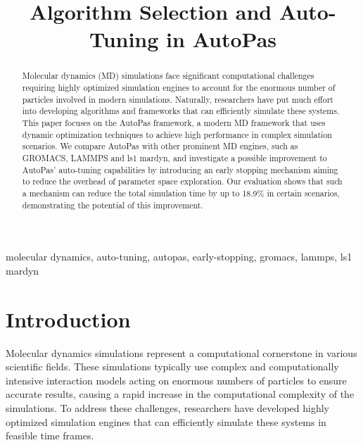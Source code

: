 \documentclass[conference]{IEEEtran}
\begin{document}
\title{Algorithm Selection and Auto-Tuning in AutoPas}

\author{
}

\maketitle

\begin{abstract}
    Molecular dynamics (MD) simulations face significant computational challenges requiring highly optimized simulation engines to account for the enormous number of particles involved in modern simulations. Naturally, researchers have put much effort into developing algorithms and frameworks that can efficiently simulate these systems. This paper focuses on the AutoPas framework, a modern MD framework that uses dynamic optimization techniques to achieve high performance in complex simulation scenarios. We compare AutoPas with other prominent MD engines, such as GROMACS, LAMMPS and ls1 mardyn, and investigate a possible improvement to AutoPas' auto-tuning capabilities by introducing an early stopping mechanism aiming to reduce the overhead of parameter space exploration. Our evaluation shows that such a mechanism can reduce the total simulation time by up to 18.9\% in certain scenarios, demonstrating the potential of this improvement.
\end{abstract}

\begin{IEEEkeywords}
    molecular dynamics, auto-tuning, autopas, early-stopping, gromacs, lammps, ls1 mardyn
\end{IEEEkeywords}

\section{Introduction}

Molecular dynamics simulations represent a computational cornerstone in various scientific fields. These simulations typically use complex and computationally intensive interaction models acting on enormous numbers of particles to ensure accurate results, causing a rapid increase in the computational complexity of the simulations. To address these challenges, researchers have developed highly optimized simulation engines that can efficiently simulate these systems in feasible time frames.
\end{document}
